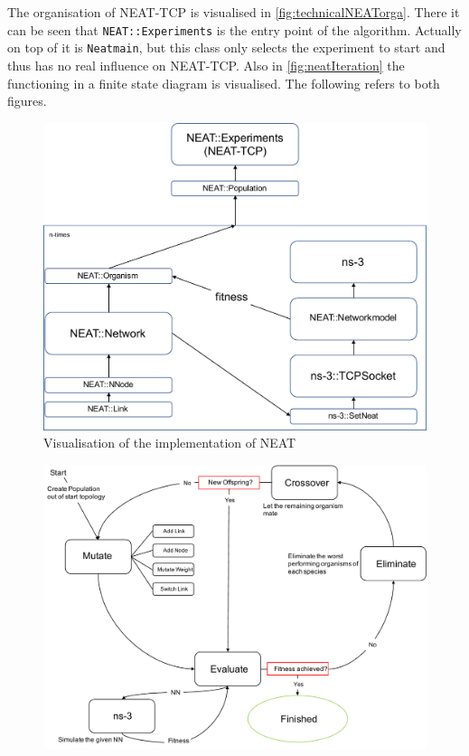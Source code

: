 The organisation of NEAT-TCP is visualised in \autoref{fig:technicalNEATorga}. There it can be seen that \texttt{NEAT::Experiments} is the entry point of the algorithm. Actually on top of it is \texttt{Neatmain}, but 
this class only selects the experiment to start and thus has no real influence on NEAT-TCP. Also in \autoref{fig:neatIteration} the functioning in a finite state diagram is visualised. The following refers to both figures.
\begin{center}
\begin{figure}
	\centering
	\includegraphics[scale=0.5]{technicalNEATorga}
	\caption{Visualisation of the implementation of NEAT}
	\label{fig:technicalNEATorga}
\end{figure}
\begin{figure}
	\centering
	\includegraphics[scale=0.5]{neatIteration}

\end{figure}
\end{center}
